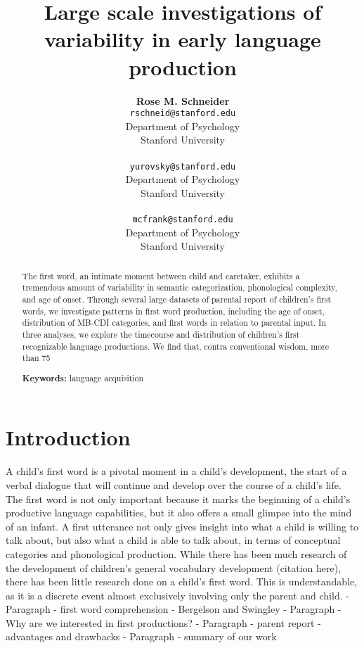 \documentclass[10pt,letterpaper]{article}
\title{Large scale investigations of variability in early language production}
\author{{\large \bf Rose M. Schneider} \\ \texttt{rschneid@stanford.edu}\\ Department of Psychology \\ Stanford University \\ 
\And {\large \bf Dan Yurovsky} \\ \texttt{yurovsky@stanford.edu} \\ Department of Psychology \\ Stanford University \\ 
\And {\large \bf Michael C. Frank} \\ \texttt{mcfrank@stanford.edu} \\ Department of Psychology \\ Stanford University \\ }
\begin{document}
\maketitle


\begin{abstract}
The first word, an intimate moment between child and caretaker, exhibits a tremendous amount of variability in semantic categorization, phonological complexity, and age of onset. Through several large datasets of parental report of children’s first words, we investigate patterns in first word production, including the age of onset, distribution of MB-CDI categories, and first words in relation to parental input. In three analyses, we explore the timecourse and distribution of children’s first recognizable language productions. We find that, contra conventional wisdom, more than 75%

\textbf{Keywords:}
language acquisition
\end{abstract}

\section{Introduction}
A child's first word is a pivotal moment in a child's development, the start of a verbal dialogue that will continue and develop over the course of a child's life. The first word is not only important because it marks the beginning of a child's productive language capabilities, but it also offers a small glimpse into the mind of an infant. A first utterance not only gives insight into what a child is willing to talk about, but also what a child is able to talk about, in terms of conceptual categories and phonological production. While there has been much research of the development of children's general vocabulary development (citation here), there has been little research done on a child's first word. This is understandable, as it is a discrete event almost exclusively involving only the parent and child. 
- Paragraph - first word comprehension - Bergelson and Swingley
- Paragraph - Why are we interested in first productions?
- Paragraph - parent report - advantages and drawbacks 
- Paragraph - summary of our work
\end{document}
